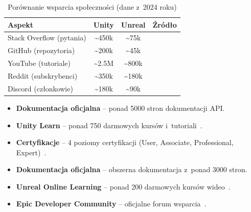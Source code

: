 \begin{table}[h!]
    \centering
    \caption{Porównanie wsparcia społeczności (dane z~2024 roku)}
    \label{tab:community}
    \begin{tabular}{|l|c|c|c|}
        \hline
        \textbf{Aspekt} & \textbf{Unity} & \textbf{Unreal} & \textbf{Źródło} \\
        \hline\hline
        Stack Overflow (pytania) & \textasciitilde450k & \textasciitilde75k & \cite{christopoulou2017overview} \\
        \hline
        GitHub (repozytoria) & \textasciitilde200k & \textasciitilde45k & \cite{vohera2021game} \\
        \hline
        YouTube (tutoriale) & \textasciitilde2.5M & \textasciitilde800k & \cite{christopoulou2017overview} \\
        \hline
        Reddit (subskrybenci) & \textasciitilde350k & \textasciitilde180k & \cite{barczak2019comparative} \\
        \hline
        Discord (członkowie) & \textasciitilde180k & \textasciitilde90k & \cite{barczak2019comparative} \\
        \hline
    \end{tabular}
\end{table}


\begin{itemize}
    \item \textbf{Dokumentacja oficjalna} -- ponad 5000 stron dokumentacji API.
    \item \textbf{Unity Learn} -- ponad 750 darmowych kursów i~tutoriali~\cite{christopoulou2017overview}.
    \item \textbf{Certyfikacje} -- 4 poziomy certyfikacji (User, Associate, Professional, Expert)~\cite{barczak2019comparative}.
\end{itemize}

\begin{itemize}
    \item \textbf{Dokumentacja oficjalna} -- obszerna dokumentacja z~ponad 3000 stron.
    \item \textbf{Unreal Online Learning} -- ponad 200 darmowych kursów wideo~\cite{christopoulou2017overview}.
    \item \textbf{Epic Developer Community} -- oficjalne forum wsparcia~\cite{barczak2019comparative}.
\end{itemize}
